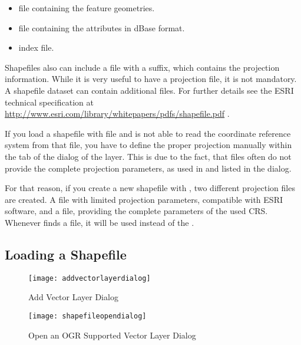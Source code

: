 \begin{itemize}[label=--]
\item {} file containing the feature geometries.
\item {} file containing the attributes in dBase format.
\item {} index file.
\end{itemize}

Shapefiles also can include a file with a  suffix, which contains
the projection information. While it is very useful to have a projection file, 
it is not mandatory. A shapefile dataset can contain additional files. For 
further details see the ESRI technical specification at 
\url{http://www.esri.com/library/whitepapers/pdfs/shapefile.pdf} 
.


If you load a shapefile with  file and \qg is not
able to read the coordinate reference system from that file, you have to define the
proper projection manually within the  tab of the  dialog of the layer. This is due to the fact, that  files 
often do not provide the complete projection parameters, as used in \qg and listed in
the  dialog.

For that reason, if you create a new shapefile with \qg, two different projection
files are created. A  file with limited projection parameters,
compatible with ESRI software, and a  file, providing the complete
parameters of the used CRS. Whenever \qg finds a  file, it will be
used instead of the .

\subsection{Loading a Shapefile}\label{sec:load_shapefile}

\begin{figure}[ht]
   \centering
   \texttt{[image: addvectorlayerdialog]}
   \caption{Add Vector Layer Dialog \nixcaption}\label{fig:addvectorlayer}
\end{figure}

\begin{figure}[ht]
   \centering
   \texttt{[image: shapefileopendialog]}
   \caption{Open an OGR Supported Vector Layer Dialog \nixcaption}\label{fig:openshapefile}
\end{figure}

